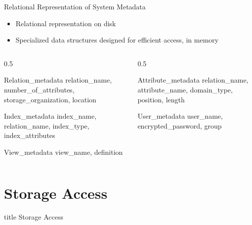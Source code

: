 \documentclass[aspectratio=169, xcolor=dvipsnames]{beamer}
\begin{document}
\begin{frame}{Relational Representation of System Metadata}
    \begin{block}{}
        \begin{itemize}
            \item Relational representation on disk
            \item Specialized data structures designed for efficient access, in memory
        \end{itemize}
    \end{block}
    \begin{columns}
        \begin{column}{0.5\textwidth}
            \begin{exampleblock}{Relation\_metadata}
                relation\_name, number\_of\_attributes, storage\_organization, location
            \end{exampleblock}
            \begin{exampleblock}{Index\_metadata}
                index\_name, relation\_name, index\_type, index\_attributes
            \end{exampleblock}
            \begin{exampleblock}{View\_metadata}
                view\_name, definition
            \end{exampleblock}
        \end{column}
        \begin{column}{0.5\textwidth}
            \begin{exampleblock}{Attribute\_metadata}
                relation\_name, attribute\_name, domain\_type, position, length
            \end{exampleblock}
            \begin{exampleblock}{User\_metadata}
                user\_name, encrypted\_password, group
            \end{exampleblock}
        \end{column}
    \end{columns}
\end{frame}

\section{Storage Access}

\begin{frame}
  \vfill
  \centering
  \begin{beamercolorbox}[sep=8pt,center,shadow=true,rounded=true]{title}
    Storage Access\par%
  \end{beamercolorbox}
  \vfill
\end{frame}
\end{document}
